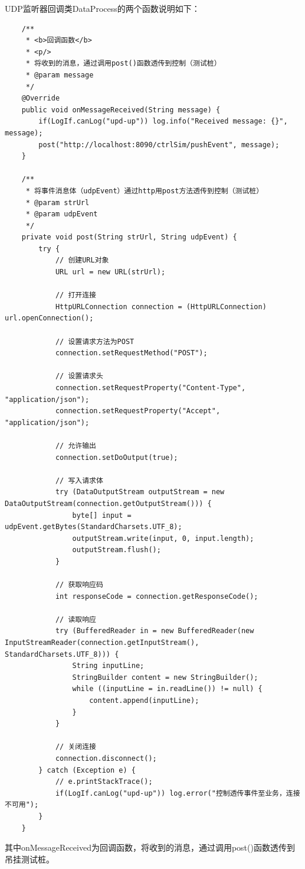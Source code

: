 UDP监听器回调类DataProcess的两个函数说明如下：
\begin{lstlisting}
    /**
     * <b>回调函数</b>
     * <p/>
     * 将收到的消息，通过调用post()函数透传到控制（测试桩）
     * @param message
     */
    @Override
    public void onMessageReceived(String message) {
        if(LogIf.canLog("upd-up")) log.info("Received message: {}", message);
        post("http://localhost:8090/ctrlSim/pushEvent", message);
    }

    /**
     * 将事件消息体（udpEvent）通过http用post方法透传到控制（测试桩）
     * @param strUrl
     * @param udpEvent
     */
    private void post(String strUrl, String udpEvent) {
        try {
            // 创建URL对象
            URL url = new URL(strUrl);

            // 打开连接
            HttpURLConnection connection = (HttpURLConnection) url.openConnection();

            // 设置请求方法为POST
            connection.setRequestMethod("POST");

            // 设置请求头
            connection.setRequestProperty("Content-Type", "application/json");
            connection.setRequestProperty("Accept", "application/json");

            // 允许输出
            connection.setDoOutput(true);

            // 写入请求体
            try (DataOutputStream outputStream = new DataOutputStream(connection.getOutputStream())) {
                byte[] input = udpEvent.getBytes(StandardCharsets.UTF_8);
                outputStream.write(input, 0, input.length);
                outputStream.flush();
            }

            // 获取响应码
            int responseCode = connection.getResponseCode();

            // 读取响应
            try (BufferedReader in = new BufferedReader(new InputStreamReader(connection.getInputStream(), StandardCharsets.UTF_8))) {
                String inputLine;
                StringBuilder content = new StringBuilder();
                while ((inputLine = in.readLine()) != null) {
                    content.append(inputLine);
                }
            }

            // 关闭连接
            connection.disconnect();
        } catch (Exception e) {
            // e.printStackTrace();
            if(LogIf.canLog("upd-up")) log.error("控制透传事件至业务，连接不可用");
        }
    }
\end{lstlisting}\vspace{-30pt}
其中onMessageReceived为回调函数，将收到的消息，通过调用post()函数透传到吊挂测试桩。

